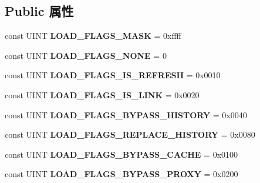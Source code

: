 \subsection*{Public 属性}
\begin{DoxyCompactItemize}
\item 
\mbox{\label{interfacens_i_web_navigation_ad2a707bb25578c09dd72c13458e2f33b}} 
const U\+I\+NT {\bfseries L\+O\+A\+D\+\_\+\+F\+L\+A\+G\+S\+\_\+\+M\+A\+SK} = 0xffff
\item 
\mbox{\label{interfacens_i_web_navigation_a40b927429f3599c24ad5fb131382aed7}} 
const U\+I\+NT {\bfseries L\+O\+A\+D\+\_\+\+F\+L\+A\+G\+S\+\_\+\+N\+O\+NE} = 0
\item 
\mbox{\label{interfacens_i_web_navigation_a73280b3924628ca1e33f925081c671f8}} 
const U\+I\+NT {\bfseries L\+O\+A\+D\+\_\+\+F\+L\+A\+G\+S\+\_\+\+I\+S\+\_\+\+R\+E\+F\+R\+E\+SH} = 0x0010
\item 
\mbox{\label{interfacens_i_web_navigation_ab988650215371fd9af65b05e24326b3f}} 
const U\+I\+NT {\bfseries L\+O\+A\+D\+\_\+\+F\+L\+A\+G\+S\+\_\+\+I\+S\+\_\+\+L\+I\+NK} = 0x0020
\item 
\mbox{\label{interfacens_i_web_navigation_a78303e1cb07f41a242f5a6c3aea07f13}} 
const U\+I\+NT {\bfseries L\+O\+A\+D\+\_\+\+F\+L\+A\+G\+S\+\_\+\+B\+Y\+P\+A\+S\+S\+\_\+\+H\+I\+S\+T\+O\+RY} = 0x0040
\item 
\mbox{\label{interfacens_i_web_navigation_a5dd92219dd2608e020ded1932bf8a06b}} 
const U\+I\+NT {\bfseries L\+O\+A\+D\+\_\+\+F\+L\+A\+G\+S\+\_\+\+R\+E\+P\+L\+A\+C\+E\+\_\+\+H\+I\+S\+T\+O\+RY} = 0x0080
\item 
\mbox{\label{interfacens_i_web_navigation_abcb626a6dd44b221347d307880272d76}} 
const U\+I\+NT {\bfseries L\+O\+A\+D\+\_\+\+F\+L\+A\+G\+S\+\_\+\+B\+Y\+P\+A\+S\+S\+\_\+\+C\+A\+C\+HE} = 0x0100
\item 
\mbox{\label{interfacens_i_web_navigation_a0f81702e28847a63d60e5b494085b29c}} 
const U\+I\+NT {\bfseries L\+O\+A\+D\+\_\+\+F\+L\+A\+G\+S\+\_\+\+B\+Y\+P\+A\+S\+S\+\_\+\+P\+R\+O\+XY} = 0x0200

\end{DoxyCompactItemize}
